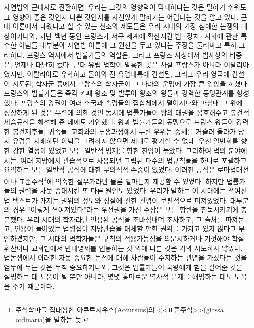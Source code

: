 자연법의 근대사로 전환하면, 우리는 그것의 영향력이 막대하다는 것은
말하기 쉬워도 그 영향이 좋은 것인지 나쁜 것인지를 자신있게
말하기는 어렵다는 것을 알고 있다.
근대  이론에서 나왔다고 할 수 있는 신조와 제도들은
우리 시대의 가장 첨예한 논쟁의 대상이거니와,
지난 백년 동안 프랑스가 서구 세계에 확산시킨 법·정치·사회에 관한
특수한 이념들 대부분이 자연법 이론에 그 원천을 두고 있다는 주장을 둘러싸고
특히 그러하다.
프랑스 역사에서 법률가들의 역할은,
그리고 프랑스 사상에서 법사상의 비중은,
언제나 대단히 컸다.
근대 유럽 법학이 발흥한 곳은 사실 프랑스가 아니라 이탈리아였지만,
이탈리아로 유학하고 돌아와 전 유럽대륙에 건설된,
그리고  우리 영국에 건설이 시도된,
학자군 중에서 프랑스의 학자군이 그 나라의 운명에 가장 큰
영향을 끼쳤다.
프랑스의 법률가들은 즉각 카페 왕조 및 발루아 왕조의 왕들과
강력한 동맹관계를 형성했다.
프랑스의 왕권이 여러 소국과 속령들의 집합체에서 떨어져나와
마침내 그 위에 성장하게 된 것은 무력에 의한 것인 동시에
법률가들이 왕의 대권을 옹호해주고 봉건적 세습규칙을 해석해 준 데에도 기인했다.
왕과 법률가들의 동맹으로 프랑스 왕들이
강력한 봉건제후들, 귀족들, 교회와의 투쟁과정에서 누린 우위는
중세를 거슬러 올라가 당시 유럽을 지배하던 이념을 고려하지 않으면
제대로 평가할 수 없다.
우선 일반화를 향한 강한 열정이 있었고 모든 일반적 명제를 향한 찬양이 높았다.
그리하여 법의 분야에서는, 여러 지방에서 관습적으로 사용되던 고립된
다수의 법규칙들을 하나로
포괄하고 요약하는 모든 일반적 공식에 대한 무의식적 존중이 있었다.
이러한 공식은 로마법대전이나 표준주석\footnote{%
  주석학파를 집대성한
  아쿠르시우스(Accursius)의 <<표준주석>>(glossa ordinaria)을 말하는 듯.}에
익숙한 실무가라면 물론 얼마든지 제공할 수 있었다.
하지만 법률가들의 권력을 사뭇 증대시킨 또 다른 원인도 있었다.
우리가 말하는 이 시대에는 쓰여진 법 텍스트가 가지는 권위의 정도와 성질에 관한
관념이 보편적으로 퍼져있었다.
대부분의 경우 ``이렇게 쓰여져있다''라는 우선권을 가진
주장은 모든 항변을 침묵시키기에 충분했다.
우리 시대의 학자라면 인용된 공식을 조바심내며 조사하고,
그 출처를 따져묻고,  인용이 들어있는 법령집이
지방관습을 대체할 만한 권위를 가지고 있지 않다고 부인하겠지만,
그 시대의 법학자들은 규칙의 적용가능성을 의문시하거나
기껏해야 학설휘찬이나 교회법에서 반대명제를 인용하는 것 외에
다른 것은 거의 시도하지 않았다.
법논쟁에서 이러한 자못 중요한 논점에 대해 사람들이 주저하는 관념을 가졌다는 것을
염두에 두는 것은 무척 중요하거니와,
그것은 법률가들이 국왕에게 힘을 실어준 것을 설명하는 데 도움이 될 뿐만 아니라,
몇몇 흥미로운 역사적 문제를 해명하는 데도 도움을 주기 때문이다.
